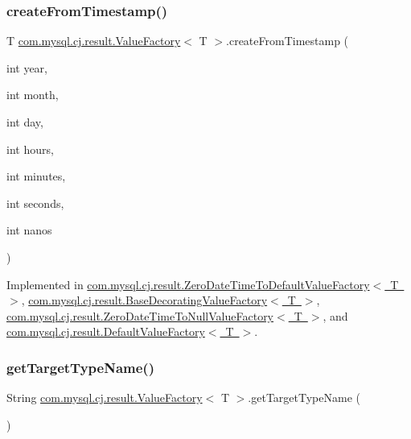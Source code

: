 \subsubsection{\texorpdfstring{create\+From\+Timestamp()}{createFromTimestamp()}}
{\footnotesize\ttfamily T \mbox{\hyperlink{interfacecom_1_1mysql_1_1cj_1_1result_1_1_value_factory}{com.\+mysql.\+cj.\+result.\+Value\+Factory}}$<$ T $>$.create\+From\+Timestamp (\begin{DoxyParamCaption}\item[{int}]{year,  }\item[{int}]{month,  }\item[{int}]{day,  }\item[{int}]{hours,  }\item[{int}]{minutes,  }\item[{int}]{seconds,  }\item[{int}]{nanos }\end{DoxyParamCaption})}



Implemented in \mbox{\hyperlink{classcom_1_1mysql_1_1cj_1_1result_1_1_zero_date_time_to_default_value_factory_a5b0935e9804d9f90a3fd09ce5bb78fc8}{com.\+mysql.\+cj.\+result.\+Zero\+Date\+Time\+To\+Default\+Value\+Factory$<$ T $>$}}, \mbox{\hyperlink{classcom_1_1mysql_1_1cj_1_1result_1_1_base_decorating_value_factory_a06ee3ccab4aaf494a1856920107134fc}{com.\+mysql.\+cj.\+result.\+Base\+Decorating\+Value\+Factory$<$ T $>$}}, \mbox{\hyperlink{classcom_1_1mysql_1_1cj_1_1result_1_1_zero_date_time_to_null_value_factory_acda714c019ea312d52c002f606ca097b}{com.\+mysql.\+cj.\+result.\+Zero\+Date\+Time\+To\+Null\+Value\+Factory$<$ T $>$}}, and \mbox{\hyperlink{classcom_1_1mysql_1_1cj_1_1result_1_1_default_value_factory_a826d789263a33a4a914fd4ce07aa44e9}{com.\+mysql.\+cj.\+result.\+Default\+Value\+Factory$<$ T $>$}}.

\mbox{\label{interfacecom_1_1mysql_1_1cj_1_1result_1_1_value_factory_a54de50a710778bcff410434107d34036}} 
\subsubsection{\texorpdfstring{get\+Target\+Type\+Name()}{getTargetTypeName()}}
{\footnotesize\ttfamily String \mbox{\hyperlink{interfacecom_1_1mysql_1_1cj_1_1result_1_1_value_factory}{com.\+mysql.\+cj.\+result.\+Value\+Factory}}$<$ T $>$.get\+Target\+Type\+Name (\begin{DoxyParamCaption}{ }\end{DoxyParamCaption})}



